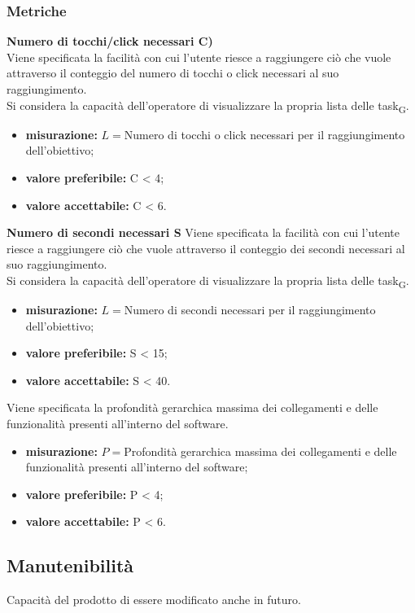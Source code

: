 \subsubsection{Metriche}
\textbf{Numero di tocchi/click necessari C)}\\
Viene specificata la facilità con cui l'utente riesce a raggiungere ciò che vuole attraverso il conteggio del numero di tocchi o click necessari al suo raggiungimento.\\
Si considera la capacità dell'operatore di visualizzare la propria lista delle \gls{task}\textsubscript{G}.
\begin{itemize}
	\item \textbf{misurazione:} $L = $Numero di tocchi o click necessari per il raggiungimento dell'obiettivo;
	\item \textbf{valore preferibile:} C < 4;
	\item \textbf{valore accettabile:} C < 6.
\end{itemize}
\textbf{Numero di secondi necessari S}
Viene specificata la facilità con cui l'utente riesce a raggiungere ciò che vuole attraverso il conteggio dei secondi necessari al suo raggiungimento.\\
Si considera la capacità dell'operatore di visualizzare la propria lista delle \gls{task}\textsubscript{G}.
\begin{itemize}
	\item \textbf{misurazione:} $L = $Numero di secondi necessari per il raggiungimento dell'obiettivo;
	\item \textbf{valore preferibile:} S < 15;
	\item \textbf{valore accettabile:} S < 40.
\end{itemize}
Viene specificata la profondità gerarchica massima dei collegamenti e delle funzionalità presenti all'interno del software.
\begin{itemize}
	\item \textbf{misurazione:} $P = $Profondità gerarchica massima dei collegamenti e delle funzionalità presenti all'interno del software;
	\item \textbf{valore preferibile:} P < 4;
	\item \textbf{valore accettabile:} P < 6.
\end{itemize}
\subsection{Manutenibilità}
Capacità del prodotto di essere modificato anche in futuro.
